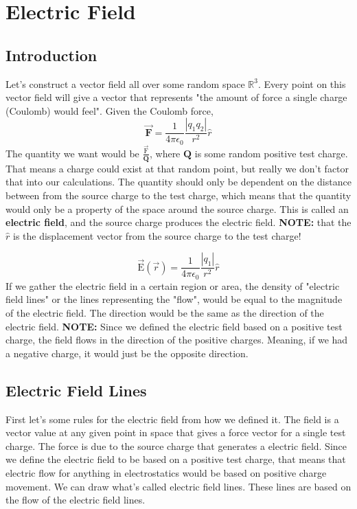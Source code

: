 \chapter{Electric Field}
\section{Introduction}
Let's construct a vector field all over some random space $\mathbb{R}^3$. Every point on this vector field will give a vector that represents "the amount of force a single charge (Coulomb) would feel". Given the Coulomb force, 
\begin{equation*}
	\vec{\mathbf{F}} = \frac{1}{4\pi\epsilon_0} \frac{|q_1q_2|}{r^2} \hat{r}
\end{equation*}
The quantity we want would be $\frac{\vec{\mathrm{F}}}{\mathbf{Q}}$, where $\mathbf{Q}$ is some random positive test charge. That means a charge could exist at that random point, but really we don't factor that into our calculations. The quantity should only be dependent on the distance between from the source charge to the test charge, which means that the quantity would only be a property of the space around the source charge. This is called an \textbf{electric field}, and the source charge produces the electric field. \textbf{NOTE:} that the $\hat{r}$ is the displacement vector from the source charge to the test charge!

\begin{equation*}
	\vec{\mathrm{E}}(\vec{r}) = \frac{1}{4\pi\epsilon_0} \frac{|q_1|}{r^2}\hat{r}
\end{equation*}
If we gather the electric field in a certain region or area, the density of "electric field lines" or the lines representing the "flow", would be equal to the magnitude of the electric field. The direction would be the same as the direction of the electric field. \textbf{NOTE:} Since we defined the electric field based on a positive test charge, the field flows in the direction of the positive charges. Meaning, if we had a negative charge, it would just be the opposite direction.

\section{Electric Field Lines}
First let's some rules for the electric field from how we defined it. The field is a vector value at any given point in space that gives a force vector for a single test charge. The force is due to the source charge that generates a electric field. Since we define the electric field to be based on a positive test charge, that means that electric flow for anything in electrostatics would be based on positive charge movement. We can draw what's called electric field lines. These lines are based on the flow of the electric field lines. 

